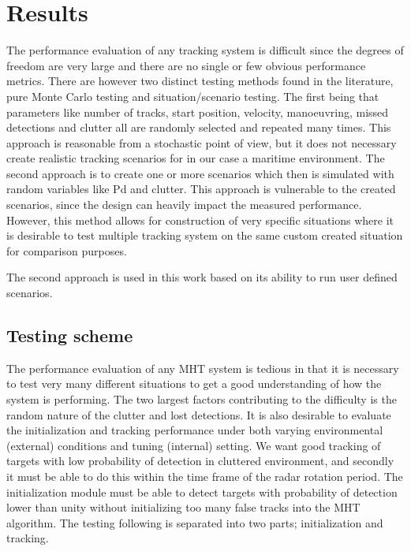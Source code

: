\chapter{Results}\label{chapter:results}
The performance evaluation of any tracking system is difficult since the degrees of freedom are very large and there are no single or few obvious performance metrics. There are however two distinct testing methods found in the literature, pure Monte Carlo testing and situation/scenario testing. The first being that parameters like number of tracks, start position, velocity, manoeuvring, missed detections and clutter all are randomly selected and repeated many times. This approach is reasonable from a stochastic point of view, but it does not necessary create realistic tracking scenarios for in our case a maritime environment. The second approach is to create one or more scenarios which then is simulated with random variables like \gls{Pd} and clutter. This approach is vulnerable to the created scenarios, since the design can heavily impact the measured performance. However, this method allows for construction of very specific situations where it is desirable to test multiple tracking system on the same custom created situation for comparison purposes.

The second approach is used in this work based on its ability to run user defined scenarios.

\section{Testing scheme}
The performance evaluation of any MHT system is tedious in that it is necessary to test very many different situations to get a good understanding of how the system is performing. The two largest factors contributing to the difficulty is the random nature of the clutter and lost detections. It is also desirable to evaluate the initialization and tracking performance under both varying environmental (external) conditions and tuning (internal) setting. We want good tracking of targets with low probability of detection in cluttered environment, and secondly it must be able to do this within the time frame of the radar rotation period. The initialization module must be able to detect targets with probability of detection lower than unity without initializing too many false tracks into the MHT algorithm. The testing following is separated into two parts; initialization and tracking.

